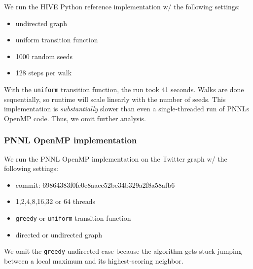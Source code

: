 \documentclass[10pt,oneside]{memoir}
\providecommand{\tightlist}{%
  \setlength{\itemsep}{0pt}\setlength{\parskip}{0pt}}
\begin{document}
We run the HIVE Python reference implementation w/ the following
settings:

\begin{itemize}
\tightlist
\item
  undirected graph
\item
  uniform transition function
\item
  1000 random seeds
\item
  128 steps per walk
\end{itemize}

With the \texttt{uniform} transition function, the run took 41 seconds.
Walks are done sequentially, so runtime will scale linearly with the
number of seeds. This implementation is \emph{substantially} slower than
even a single-threaded run of PNNLs OpenMP code. Thus, we omit further
analysis.

\hypertarget{pnnl-openmp-implementation}{%
\subsubsection{PNNL OpenMP
implementation}\label{pnnl-openmp-implementation}}

We run the PNNL OpenMP implementation on the Twitter graph w/ the
following settings:

\begin{itemize}
\tightlist
\item
  commit: 69864383f0fc0e8aace52be34b329a2f8a58afb6
\item
  1,2,4,8,16,32 or 64 threads
\item
  \texttt{greedy} or \texttt{uniform} transition function
\item
  directed or undirected graph
\end{itemize}

We omit the \texttt{greedy} undirected case because the algorithm gets
stuck jumping between a local maximum and its highest-scoring neighbor.
\end{document}
